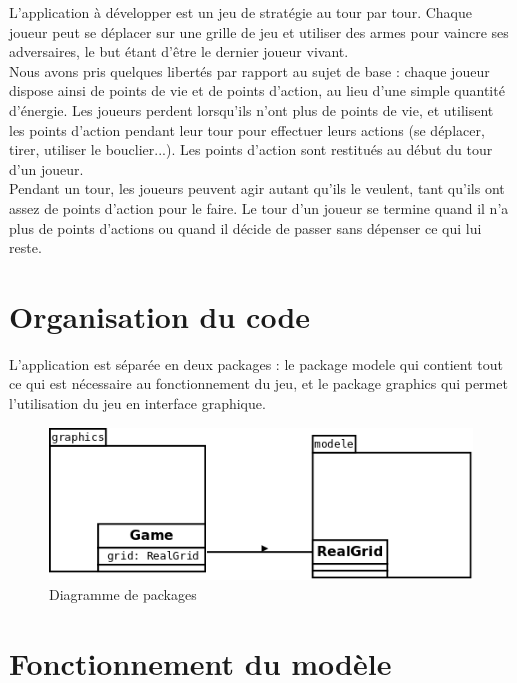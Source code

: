 \documentclass[a4paper,12pt]{article} %
\begin{document}
L'application à développer est un jeu de stratégie au tour par tour. Chaque joueur peut se déplacer sur une grille de jeu et utiliser des armes pour vaincre ses adversaires, le but étant d'être le dernier joueur vivant.\\
Nous avons pris quelques libertés par rapport au sujet de base : chaque joueur dispose ainsi de points de vie et de points d'action, au lieu d'une simple quantité d'énergie.
Les joueurs perdent lorsqu'ils n'ont plus de points de vie, et utilisent les points d'action pendant leur tour pour effectuer leurs actions (se déplacer, tirer, utiliser le bouclier...). Les points d'action sont restitués au début du tour d'un joueur.\\
Pendant un tour, les joueurs peuvent agir autant qu'ils le veulent, tant qu'ils ont assez de points d'action pour le faire. Le tour d'un joueur se termine quand il n'a plus de points d'actions ou quand il décide de passer sans dépenser ce qui lui reste.

\section{Organisation du code}

L'application est séparée en deux packages : le package modele qui contient tout ce qui est nécessaire au fonctionnement du jeu, et le package graphics qui permet l'utilisation du jeu en interface graphique.

\begin{figure}[!h]
\centering
\includegraphics[scale=0.5]{images/packages.png}
\caption{Diagramme de packages}
\end{figure}

\newpage

\section{Fonctionnement du modèle}
\end{document}
